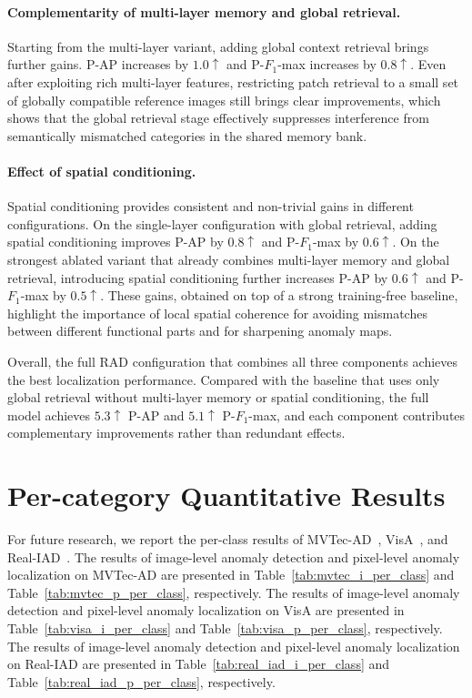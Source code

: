 \documentclass{article}
\theoremstyle{plain}
\theoremstyle{definition}
\theoremstyle{remark}
\begin{document}
\paragraph{Complementarity of multi-layer memory and global retrieval.}
Starting from the multi-layer variant, adding global context retrieval brings further gains. P-AP increases by
$1.0\uparrow$ and P-$F_1$-max increases by $0.8\uparrow$. Even after exploiting rich multi-layer features, restricting
patch retrieval to a small set of globally compatible reference images still brings clear improvements, which shows that
the global retrieval stage effectively suppresses interference from semantically mismatched categories in the shared
memory bank.

\paragraph{Effect of spatial conditioning.}
Spatial conditioning provides consistent and non-trivial gains in different configurations. On the single-layer
configuration with global retrieval, adding spatial conditioning improves P-AP by $0.8\uparrow$ and P-$F_1$-max
by $0.6\uparrow$. On the strongest ablated variant that already combines multi-layer memory and global retrieval,
introducing spatial conditioning further increases P-AP by $0.6\uparrow$ and P-$F_1$-max by $0.5\uparrow$. These gains,
obtained on top of a strong training-free baseline, highlight the importance of local spatial coherence for avoiding
mismatches between different functional parts and for sharpening anomaly maps.

Overall, the full RAD configuration that combines all three components achieves the best localization performance.
Compared with the baseline that uses only global retrieval without multi-layer memory or spatial conditioning,
the full model achieves $5.3\uparrow$ P-AP and $5.1\uparrow$ P-$F_1$-max, and each component contributes complementary
improvements rather than redundant effects.





\section{Per-category Quantitative Results}
\label{sec:pre-category}
For future research, we report the per-class results of MVTec-AD~\cite{bergmann2019mvtec}, VisA~\cite{zou2022spot}, and Real-IAD~\cite{wang2024real}.
The results of image-level anomaly detection and pixel-level anomaly localization on MVTec-AD are presented in
Table~\ref{tab:mvtec_i_per_class} and Table~\ref{tab:mvtec_p_per_class}, respectively.
The results of image-level anomaly detection and pixel-level anomaly localization on VisA are presented in
Table~\ref{tab:visa_i_per_class} and Table~\ref{tab:visa_p_per_class}, respectively.
The results of image-level anomaly detection and pixel-level anomaly localization on Real-IAD are presented in
Table~\ref{tab:real_iad_i_per_class} and Table~\ref{tab:real_iad_p_per_class}, respectively.
\end{document}
